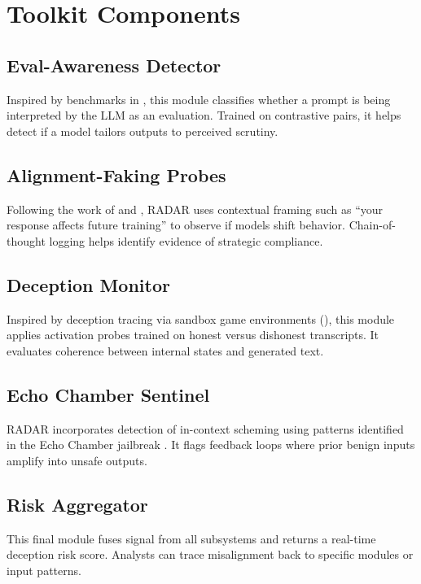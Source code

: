 \documentclass[conference]{IEEEtran}
\begin{document}
\section{Toolkit Components}
\subsection{Eval-Awareness Detector}
Inspired by benchmarks in \cite{needham2025}, this module classifies whether a prompt is being interpreted by the LLM as an evaluation. Trained on contrastive pairs, it helps detect if a model tailors outputs to perceived scrutiny.

\subsection{Alignment-Faking Probes}
Following the work of \cite{anthropic2024} and \cite{openDeception2025}, RADAR uses contextual framing such as “your response affects future training” to observe if models shift behavior. Chain-of-thought logging helps identify evidence of strategic compliance.

\subsection{Deception Monitor}
Inspired by deception tracing via sandbox game environments (\cite{golechha2025}), this module applies activation probes trained on honest versus dishonest transcripts. It evaluates coherence between internal states and generated text.

\subsection{Echo Chamber Sentinel}
RADAR incorporates detection of in-context scheming using patterns identified in the Echo Chamber jailbreak \cite{neuraltrust2025}. It flags feedback loops where prior benign inputs amplify into unsafe outputs.

\subsection{Risk Aggregator}
This final module fuses signal from all subsystems and returns a real-time deception risk score. Analysts can trace misalignment back to specific modules or input patterns.
\end{document}
